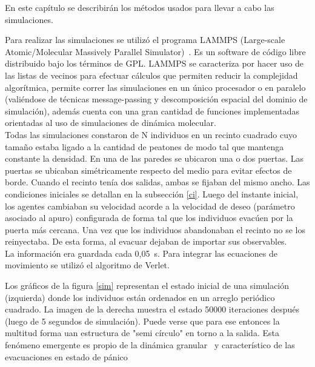 
En este capítulo se describirán los métodos usados para llevar a cabo las simulaciones.

Para realizar las simulaciones se utilizó el programa LAMMPS (Large-scale Atomic/Molecular Massively Parallel Simulator)~\cite{plimpton}.
Es un software de código libre distribuido bajo los términos de GPL.
LAMMPS se caracteriza por hacer uso de las listas de vecinos para efectuar cálculos que permiten reducir la 
complejidad algorítmica, permite correr las simulaciones en un único procesador o en paralelo (valiéndose de técnicas message-passing y descomposición espacial del dominio de simulación), además cuenta con una gran cantidad de funciones implementadas orientadas al uso de simulaciones de dinámica molecular. \\

Todas las simulaciones constaron de N individuos en un recinto cuadrado cuyo tamaño estaba ligado a la cantidad de
peatones de modo tal que mantenga constante la densidad. En una de las paredes se ubicaron una o dos puertas. Las puertas se ubicaban simétricamente respecto del medio para evitar efectos de borde. Cuando el recinto tenía dos salidas, ambas se fijaban del mismo ancho.
Las condiciones iniciales se detallan en la subsección \ref{ci}.  Luego del instante inicial, los agentes cambiaban su velocidad acorde a la velocidad de deseo (parámetro asociado al apuro) configurada de forma tal que los individuos evacúen por la puerta más cercana. Una vez que los individuos abandonaban el recinto no se los reinyectaba. De esta forma, al evacuar dejaban de importar sus observables. \\

La información era guardada cada 0,05~s. Para integrar las ecuaciones de movimiento se utilizó el algoritmo de Verlet. 

Los gráficos de la figura \ref{sim} representan el estado inicial de una simulación (izquierda) donde los individuos están ordenados en un arreglo periódico cuadrado. La imagen de la derecha muestra el estado 50000 iteraciones después (luego de 5 segundos de simulación). Puede verse que para ese entonces la multitud forma uan estructura de "semi círculo" en torno a la salida. Esta fenómeno emergente es propio de la dinámica granular~\cite{To} y característico de las evacuaciones en estado de pánico~\cite{Helbing1}  

